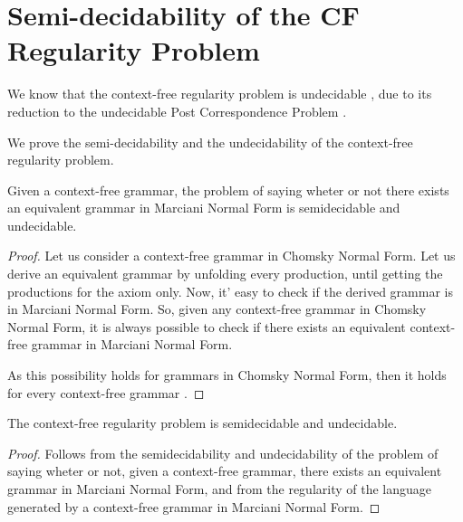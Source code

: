 \section{Semi-decidability of the CF Regularity Problem}
\label{sec:semi-decidability}

We know that the context-free regularity problem is undecidable \cite{Pettorossi13}, due to its reduction to the undecidable Post Correspondence Problem \cite{Hopcroft06}.

We prove the semi-decidability and the undecidability of the context-free regularity problem.

\begin{theorem}
	\label{thm:semi-decidability-mnf}	
	Given a context-free grammar, the problem of saying wheter or not there exists an equivalent grammar in Marciani Normal Form is semidecidable and undecidable.
	
	\begin{proof}
		Let us consider a context-free grammar in Chomsky Normal Form. Let us derive an equivalent grammar by unfolding every production, until getting the productions for the axiom only. Now, it' easy to check if the derived grammar is in Marciani Normal Form. So, given any context-free grammar in Chomsky Normal Form, it is always possible to check if there exists an equivalent context-free grammar in Marciani Normal Form.
		
		As this possibility holds for grammars in Chomsky Normal Form, then it holds for every context-free grammar \cite{Pettorossi13}.
	\end{proof}
\end{theorem}

\begin{theorem}
	\label{thm:semi-decidability}
	The context-free regularity problem is semidecidable and undecidable.
	
	\begin{proof}
		Follows from the semidecidability and undecidability of the problem of saying wheter or not, given a context-free grammar, there exists an equivalent grammar in Marciani Normal Form, and from the regularity of the language generated by a context-free grammar in Marciani Normal Form.
	\end{proof}
\end{theorem}